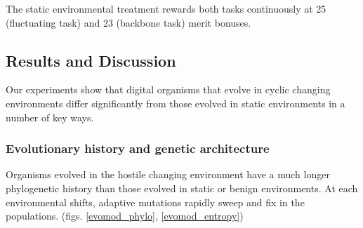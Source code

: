 The static environmental treatment rewards both tasks continuously at 25 (fluctuating task) and 23 (backbone task) merit bonuses.
\subsection{Results and Discussion}
Our experiments show that digital organisms that evolve in cyclic changing environments differ significantly from those evolved in static environments in a number of key ways.
\subsubsection{Evolutionary history and genetic architecture}
Organisms evolved in the hostile changing environment have a much longer phylogenetic history than those evolved in static or benign environments. At each environmental shifts, adaptive mutations rapidly sweep and fix in the populations. (figs. \ref{evomod_phylo}, \ref{evomod_entropy})
